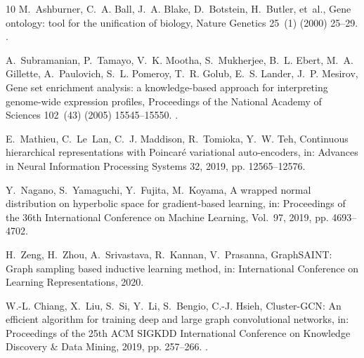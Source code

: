 \documentclass[preprint,12pt]{elsarticle}
\begin{document}
\begin{thebibliography}{10}
M.~Ashburner, C.~A. Ball, J.~A. Blake, D.~Botstein, H.~Butler, et~al.,
  Gene ontology: tool for the unification of biology,
  Nature Genetics 25~(1) (2000) 25--29.
\newblock \href {https://doi.org/10.1038/75556}
  {}.

A.~Subramanian, P.~Tamayo, V.~K. Mootha, S.~Mukherjee, B.~L. Ebert,
  M.~A. Gillette, A.~Paulovich, S.~L. Pomeroy, T.~R. Golub, E.~S. Lander,
  J.~P. Mesirov,
  Gene set enrichment analysis: a knowledge-based approach for
  interpreting genome-wide expression profiles,
  Proceedings of the National Academy of Sciences 102~(43) (2005)
  15545--15550.
\newblock \href {https://doi.org/10.1073/pnas.0506580102}
  {}.

E.~Mathieu, C.~Le~Lan, C.~J. Maddison, R.~Tomioka, Y.~W. Teh,
  Continuous hierarchical representations with {Poincar{\'e}}
  variational auto-encoders, in: Advances in Neural Information
  Processing Systems 32, 2019, pp. 12565--12576.

Y.~Nagano, S.~Yamaguchi, Y.~Fujita, M.~Koyama,
  A wrapped normal distribution on hyperbolic space for gradient-based
  learning, in: Proceedings of the 36th International Conference on
  Machine Learning, Vol.~97, 2019, pp. 4693--4702.

H.~Zeng, H.~Zhou, A.~Srivastava, R.~Kannan, V.~Prasanna,
  {GraphSAINT}: Graph sampling based inductive learning method, in:
  International Conference on Learning Representations, 2020.

W.-L. Chiang, X.~Liu, S.~Si, Y.~Li, S.~Bengio, C.-J. Hsieh,
  {Cluster-GCN}: An efficient algorithm for training deep and large
  graph convolutional networks, in: Proceedings of the 25th ACM SIGKDD
  International Conference on Knowledge Discovery \& Data Mining, 2019,
  pp. 257--266.
\newblock \href {https://doi.org/10.1145/3292500.3330925}
  {}.

\end{thebibliography}
\end{document}
